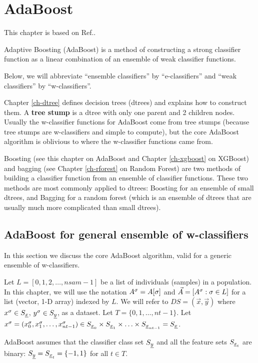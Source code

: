 \chapter{AdaBoost}
\label{ch-adaboost}

This chapter
is based on Ref.\cite{wiki-adaboost}.


Adaptive Boosting (AdaBoost) is 
a method of constructing
a strong
classifier function
as a linear 
combination
of an ensemble
of weak classifier
functions.

Below,
we will abbreviate
\enquote{ensemble classifiers} by \enquote{e-classifiers}
and \enquote{weak classifiers} by \enquote{w-classifiers}.


Chapter \ref{ch-dtree}
defines decision trees (dtrees)
and explains how to construct them.
A
{\bf tree stump}
is a dtree  with only one
parent and 2 children nodes.
Usually the 
w-classifier functions
for AdaBoost
come from tree stumps
(because tree stumps
are w-classifiers
and simple to compute), but
the core
AdaBoost algorithm
is oblivious to 
where the w-classifier functions came from.

Boosting
(see this chapter on AdaBoost
and
Chapter \ref{ch-xgboost} on XGBoost)
and bagging
(see Chapter \ref{ch-rforest} on Random Forest)
are two methods
of building a classifier function
from an ensemble 
of classifier functions.
These two methods are most commonly
applied to dtrees: Boosting for an ensemble of
small dtrees, and Bagging for a random
forest (which
is an ensemble
of dtrees that are usually much more
complicated than small dtrees).


\section{AdaBoost for general ensemble
of w-classifiers}
In this 
section 
we discuss the core AdaBoost
algorithm,
valid for a generic ensemble of w-classifiers.

Let $L=[0,1,2, \ldots, nsam-1]$ be a list of
individuals (samples) in a population.
In this chapter, we will use the notation 
$A^\sigma=A[\sigma]$ 
and $\vec{A}=[A^\sigma:\sigma\in L]$
for a  list (vector, 1-D  array) indexed by $L$.
We will refer to $DS=(\vec{x}, \vec{y})$ 
where $x^\sigma\in S_{\underline{x}}$, $y^\sigma\in S_{\underline{y}}$,
as a dataset. 
Let $T=\{0,1, \dots, nt-1\}$.
Let
$x^\sigma=(x^\sigma_0, x^\sigma_1, \ldots, x^\sigma_{nt-1})
\in S_{{\underline{x}}_0}\times S_{{\underline{x}}_1}
\times\ldots\times
 S_{{\underline{x}}_{nt-1}}=S_{\underline{x}}$.

AdaBoost assumes
that the classifier class set
$S_{\underline{y}}$  and
all the feature sets $S_{{\underline{x}}_t}$ 
are
binary:
$S_{\underline{y}}=S_{{\underline{x}}_t}=\{-1, 1\}$ for 
all $t\in T$.


